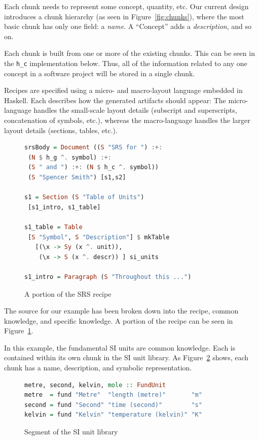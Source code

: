 \documentclass{sig-alternate-05-2015}
\begin{document}
Each chunk needs to represent some concept, quantity, etc. Our current design
introduces a chunk hierarchy (as seen in Figure~\ref{fig:chunks}), where the
most basic chunk has only one field: a \textit{name}. A ``Concept'' adds a
\textit{description}, and so on.

Each chunk is built from one or more of the existing chunks. This can be seen in
the \verb|h_c| implementation below. Thus, all of the information related to any
one concept in a software project will be stored in a single chunk.

Recipes are specified using a micro- and macro-layout language embedded in
Haskell. Each describes how the generated artifacts should appear: The
micro-language handles the small-scale layout details (subscript and
superscripts, concatenation of symbols, etc.), whereas the macro-language
handles the larger layout details (sections, tables, etc.).

\begin{figure}[tb]
\begin{lstlisting}[language=Haskell, frame=single, 
  showstringspaces=false, basicstyle=\scriptsize]
srsBody = Document ((S "SRS for ") :+: 
 (N $ h_g ^. symbol) :+: 
 (S " and ") :+: (N $ h_c ^. symbol)) 
 (S "Spencer Smith") [s1,s2]

s1 = Section (S "Table of Units") 
 [s1_intro, s1_table]

s1_table = Table 
 [S "Symbol", S "Description"] $ mkTable
   [(\x -> Sy (x ^. unit)),
    (\x -> S (x ^. descr)) ] si_units

s1_intro = Paragraph (S "Throughout this ...")
\end{lstlisting}
\caption{A portion of the SRS recipe}
\label{fig:recipe}
\end{figure}

The source for our example has been broken down into the recipe, common
knowledge, and specific knowledge. A portion of the recipe can be seen in
Figure~\ref{fig:recipe}.

In this example, the fundamental SI units are common knowledge. Each is
contained within its own chunk in the SI unit library. As
Figure~\ref{fig:know_common} shows, each chunk has a name, description, and
symbolic representation.

\begin{figure}[thb]
\begin{lstlisting}[language=Haskell, frame=single, showstringspaces=false, 
  basicstyle=\scriptsize]
metre, second, kelvin, mole :: FundUnit
metre  = fund "Metre"  "length (metre)"       "m"
second = fund "Second" "time (second)"        "s"
kelvin = fund "Kelvin" "temperature (kelvin)" "K"
\end{lstlisting}
\caption{Segment of the SI unit library}
\label{fig:know_common}
\end{figure}
\end{document}
